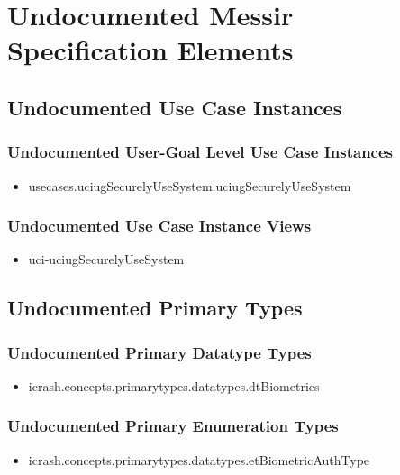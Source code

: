 	
\chapter{Undocumented Messir Specification Elements}





\section[Undocumented Use Case Instances]{Undocumented Use Case Instances}


\subsection[Undocumented Use Case Instances - User-Goal Level]{Undocumented User-Goal Level Use Case Instances}
\begin{itemize}
\item usecases.uciugSecurelyUseSystem.uciugSecurelyUseSystem 
\end{itemize}


\subsection[Undocumented Use Case Instance Views]{Undocumented Use Case Instance Views}
\begin{itemize}
\item uci-uciugSecurelyUseSystem 
\end{itemize}






\section[Undocumented Primary Types]{Undocumented Primary Types}


\subsection[Undocumented Primary Datatype Types]{Undocumented Primary Datatype Types}
\begin{itemize}
\item icrash.concepts.primarytypes.datatypes.dtBiometrics 
\end{itemize}

\subsection[Undocumented Primary Enumeration Types]{Undocumented Primary Enumeration Types}
\begin{itemize}
\item icrash.concepts.primarytypes.datatypes.etBiometricAuthType 
\end{itemize}






